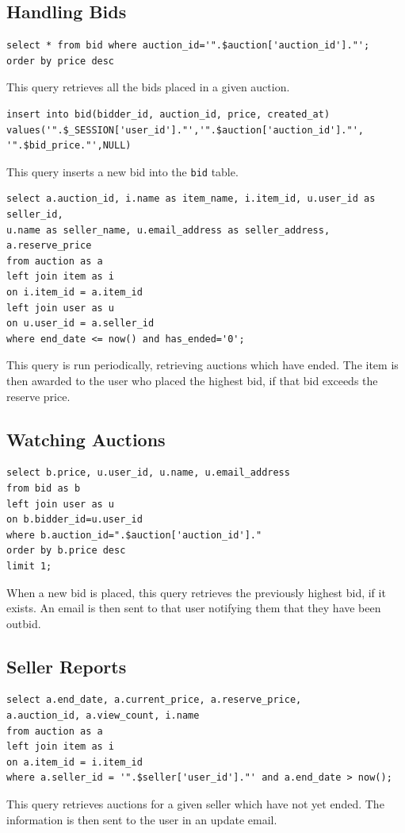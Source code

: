 \documentclass{article}
\begin{document}
\subsection{Handling Bids}
\begin{verbatim}
select * from bid where auction_id='".$auction['auction_id']."';
order by price desc
\end{verbatim}
This query retrieves all the bids placed in a given auction.

\begin{verbatim}
insert into bid(bidder_id, auction_id, price, created_at)
values('".$_SESSION['user_id']."','".$auction['auction_id']."',
'".$bid_price."',NULL)
\end{verbatim}
This query inserts a new bid into the \texttt{bid} table.

\begin{verbatim}
select a.auction_id, i.name as item_name, i.item_id, u.user_id as seller_id,
u.name as seller_name, u.email_address as seller_address, a.reserve_price
from auction as a
left join item as i
on i.item_id = a.item_id
left join user as u
on u.user_id = a.seller_id
where end_date <= now() and has_ended='0';
\end{verbatim}
This query is run periodically, retrieving auctions which have ended. The item is then awarded to the user who placed the highest bid, if that bid exceeds the reserve price.

\subsection{Watching Auctions}
\begin{verbatim}
select b.price, u.user_id, u.name, u.email_address
from bid as b
left join user as u
on b.bidder_id=u.user_id
where b.auction_id=".$auction['auction_id']."
order by b.price desc
limit 1;
\end{verbatim}
When a new bid is placed, this query retrieves the previously highest bid, if it exists. An email is then sent to that user notifying them that they have been outbid.

\subsection{Seller Reports}
\begin{verbatim}
select a.end_date, a.current_price, a.reserve_price,
a.auction_id, a.view_count, i.name
from auction as a
left join item as i
on a.item_id = i.item_id
where a.seller_id = '".$seller['user_id']."' and a.end_date > now();
\end{verbatim}
This query retrieves auctions for a given seller which have not yet ended. The information is then sent to the user in an update email.
\end{document}
